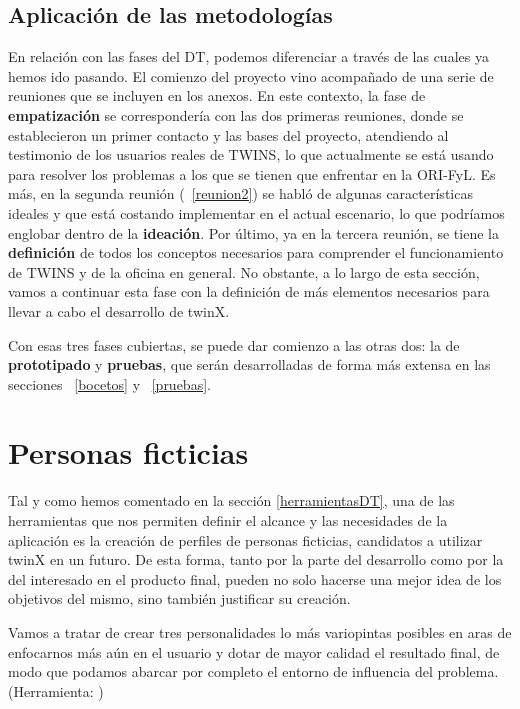 \subsection{Aplicación de las metodologías}

En relación con las fases del DT, podemos diferenciar a través de las cuales ya hemos ido pasando. El comienzo del proyecto vino acompañado de una serie de reuniones que se incluyen en los anexos. En este contexto, la fase de \textbf{empatización} se correspondería con las dos primeras reuniones, donde se establecieron un primer contacto y las bases del proyecto, atendiendo al testimonio de los usuarios reales de TWINS, lo que actualmente se está usando para resolver los problemas a los que se tienen que enfrentar en la ORI-FyL. Es más, en la segunda reunión (~\ref{reunion2}) se habló de algunas características ideales y que está costando implementar en el actual escenario, lo que podríamos englobar dentro de la \textbf{ideación}. Por último, ya en la tercera reunión, se tiene la \textbf{definición} de todos los conceptos necesarios para comprender el funcionamiento de TWINS y de la oficina en general. No obstante, a lo largo de esta sección, vamos a continuar esta fase con la definición de más elementos necesarios para llevar a cabo el desarrollo de twinX.

Con esas tres fases cubiertas, se puede dar comienzo a las otras dos: la de \textbf{prototipado} y \textbf{pruebas}, que serán desarrolladas de forma más extensa en las secciones ~\ref{bocetos} y ~\ref{pruebas}. %

\section{Personas ficticias}

Tal y como hemos comentado en la sección \ref{herramientasDT}, una de las herramientas que nos permiten definir el alcance y las necesidades de la aplicación es la creación de perfiles de personas ficticias, candidatos a utilizar twinX en un futuro. De esta forma, tanto por la parte del desarrollo como por la del interesado en el producto final, pueden no solo hacerse una mejor idea de los objetivos del mismo, sino también justificar su creación.

Vamos a tratar de crear tres personalidades lo más variopintas posibles en aras de enfocarnos más aún en el usuario y dotar de mayor calidad el resultado final, de modo que podamos abarcar por completo el entorno de influencia del problema. (Herramienta: \citep{uxpressia})

